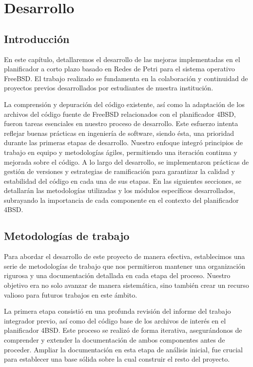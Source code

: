 \chapter{Desarrollo}

\section{Introducción}
En este capítulo, detallaremos el desarrollo de las mejoras implementadas en el planificador a corto plazo basado en Redes de Petri para el sistema operativo FreeBSD. El trabajo realizado se fundamenta en la colaboración y continuidad de proyectos previos desarrollados por estudiantes de nuestra institución.\par

La comprensión y depuración del código existente, así como la adaptación de los archivos del código fuente de FreeBSD relacionados con el planificador 4BSD, fueron tareas esenciales en nuestro proceso de desarrollo. Este esfuerzo intenta reflejar buenas prácticas en ingeniería de software, siendo ésta, una prioridad durante las primeras etapas de desarrollo. Nuestro enfoque integró principios de trabajo en equipo y metodologías ágiles, permitiendo una iteración continua y mejorada sobre el código. A lo largo del desarrollo, se implementaron prácticas de gestión de versiones y estrategias de ramificación para garantizar la calidad y estabilidad del código en cada una de sus etapas. En las siguientes secciones, se detallarán las metodologías utilizadas y los módulos específicos desarrollados, subrayando la importancia de cada componente en el contexto del planificador 4BSD.\par


\section{Metodologías de trabajo}
Para abordar el desarrollo de este proyecto de manera efectiva, establecimos una serie de metodologías de trabajo que nos permitieron mantener una organización rigurosa y una documentación detallada en cada etapa del proceso. Nuestro objetivo era no solo avanzar de manera sistemática, sino también crear un recurso valioso para futuros trabajos en este ámbito.\par

La primera etapa consistió en una profunda revisión del informe del trabajo integrador previo, así como del código base de los archivos de interés en el planificador 4BSD. Este proceso se realizó de forma iterativa, asegurándonos de comprender y extender la documentación de ambos componentes antes de proceder. Ampliar la documentación en esta etapa de análisis inicial, fue crucial para establecer una base sólida sobre la cual construir el resto del proyecto.\par

